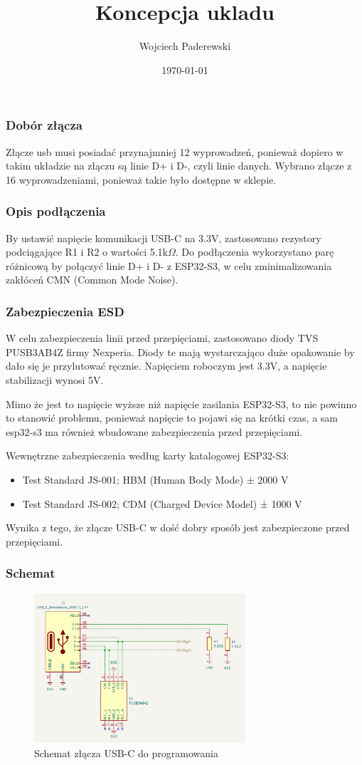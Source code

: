 \documentclass[../../main.tex]{subfiles}
\author{Wojciech Paderewski}
\date{\today}
\title{Koncepcja ukladu}
\begin{document}
\subsubsection{Dobór złącza}
Złącze usb musi posiadać przynajmniej 12 wyprowadzeń, ponieważ dopiero w takim układzie na złączu są linie D+ i D-, czyli linie danych.
Wybrano złącze z 16 wyprowadzeniami, ponieważ takie było dostępne w sklepie.
\subsubsection{Opis podłączenia}
By ustawić napięcie komunikacji USB-C na 3.3V, zastosowano rezystory podciągające R1 i R2 o wartości 5.1k$\Omega$.
Do podłączenia wykorzystano parę różnicową by połączyć linie D+ i D- z ESP32-S3, w celu zminimalizowania zakłóceń CMN (Common Mode Noise).
\subsubsection{Zabezpieczenia ESD}
W celu zabezpieczenia linii przed przepięciami, zastosowano diody TVS PUSB3AB4Z firmy Nexperia. Diody te mają wystarczająco duże opakowanie by dało się je przylutować ręcznie. Napięciem roboczym jest 3.3V,
a napięcie stabilizacji wynosi 5V.

Mimo że jest to napięcie wyższe niż napięcie zasilania ESP32-S3, to nie powinno to stanowić problemu, 
ponieważ napięcie to pojawi się na krótki czas, a sam esp32-s3 ma również wbudowane zabezpieczenia przed przepięciami.

Wewnętrzne zabezpieczenia według karty katalogowej ESP32-S3:
\begin{itemize}
    \item Test Standard JS-001; HBM (Human Body Mode) ± 2000 V
    \item Test Standard JS-002; CDM (Charged Device Model) ± 1000 V
\end{itemize}
Wynika z tego, że złącze USB-C w dość dobry sposób jest zabezpieczone przed przepięciami.
\subsubsection{Schemat}
\begin{figure}[H]
    \centering
    \includegraphics[width=0.7\textwidth]{usb-c_schemat.png}
    \caption{Schemat złącza USB-C do programowania}
\end{figure}
\end{document}
